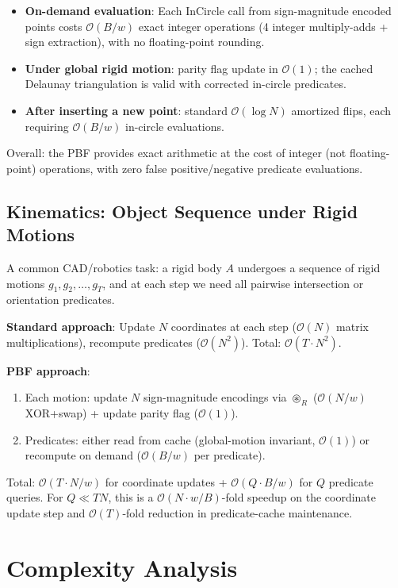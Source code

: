 \documentclass[11pt,letterpaper]{article}
\newcommand{\InCircle}{\mathrm{InCircle}}
\newcommand{\cO}{\mathcal{O}}
\newcommand{\oast}{\circledast}
\newcommand{\wt}{w}       %
\begin{document}
\begin{itemize}[nosep]
\item \textbf{On-demand evaluation}: Each $\InCircle$ call from sign-magnitude encoded
  points costs $\cO(B/\wt)$ exact integer operations (4 integer multiply-adds + sign
  extraction), with no floating-point rounding.
\item \textbf{Under global rigid motion}: parity flag update in $\cO(1)$; the cached
  Delaunay triangulation is valid with corrected in-circle predicates.
\item \textbf{After inserting a new point}: standard $\cO(\log N)$ amortized flips,
  each requiring $\cO(B/\wt)$ in-circle evaluations.
\end{itemize}

Overall: the PBF provides exact arithmetic at the cost of integer (not floating-point)
operations, with zero false positive/negative predicate evaluations.

\subsection{Kinematics: Object Sequence under Rigid Motions}

A common CAD/robotics task: a rigid body $A$ undergoes a sequence of rigid motions
$g_1,g_2,\dots,g_T$, and at each step we need all pairwise intersection or orientation
predicates.

\textbf{Standard approach}: Update $N$ coordinates at each step ($\cO(N)$ matrix
multiplications), recompute predicates ($\cO(N^2)$).  Total: $\cO(T\cdot N^2)$.

\textbf{PBF approach}:
\begin{enumerate}[nosep]
\item Each motion: update $N$ sign-magnitude encodings via $\oast_{R}$ ($\cO(N/\wt)$
  XOR+swap) + update parity flag ($\cO(1)$).
\item Predicates: either read from cache (global-motion invariant, $\cO(1)$) or
  recompute on demand ($\cO(B/\wt)$ per predicate).
\end{enumerate}
Total: $\cO(T\cdot N/\wt)$ for coordinate updates + $\cO(Q\cdot B/\wt)$ for $Q$ predicate
queries.  For $Q\ll TN$, this is a $\cO(N\cdot\wt/B)$-fold speedup on the coordinate
update step and $\cO(T)$-fold reduction in predicate-cache maintenance.

\section{Complexity Analysis}\label{sec:complexity}
\end{document}
